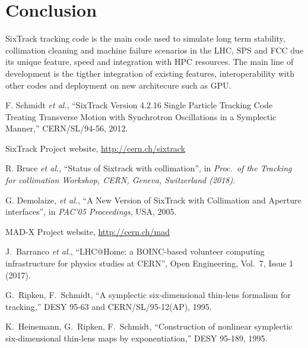 \documentclass[a4paper,
              ]{jacow}
\begin{document}
\section{Conclusion}
SixTrack tracking code is the main code used to simulate long term stability, collimation cleaning and machine failure scenarios in the LHC, SPS and FCC due its unique feature, speed and integration with HPC resources. The main line of development is the tigther integration of existing features, interoperability with other codes and deployment on new architecure such as GPU.  

\begin{thebibliography}{99}

F. Schmidt {\it et al.}, ``SixTrack Version 4.2.16 Single Particle Tracking Code Treating
Transverse Motion with Synchrotron Oscillations in a Symplectic Manner,''
CERN/SL/94-56, 2012.

SixTrack Project website, \url{http://cern.ch/sixtrack}

R. Bruce {\it et al.}, ``Status of Sixtrack with collimation'',  in \emph{Proc.~of the Tracking for collimation Workshop, CERN, Geneva, Switzerland (2018)}.



G. Demolaize, {\it et al.}, ``A New Version of SixTrack with Collimation and
Aperture interfaces'', in {\it PAC'05 Proceedings}, USA, 2005.

MAD-X Project website, \url{http://cern.ch/mad}

J.~Barranco \emph{et al.}, ``LHC@Home: a BOINC-based volunteer computing infrastructure for physics studies at CERN'', Open Engineering, Vol.~7, Issue 1 (2017).

G.~Ripken, F.~Schmidt,
``A symplectic six-dimensional thin-lens formalism for tracking,''
DESY 95-63 and CERN/SL/95-12(AP), 1995.

K.~Heinemann, G.~Ripken, F.~Schmidt, ``Construction of nonlinear symplectic
six-dimensional thin-lens maps by exponentiation,'' {DESY 95-189}, 1995.


\end{thebibliography}
\end{document}
